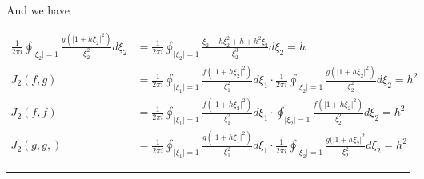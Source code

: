 \documentclass[twoside]{article}
\newenvironment{proof}{{\bf Proof:}}{\hfill\rule{2mm}{2mm}}
\begin{document}
\begin{proof}
And we have

\begin{equation}
	\begin{split}
		\frac{1}{2\pi i}\oint_{\lvert\xi_2\rvert=1}\frac{g(\lvert 1+h\xi_2\rvert^2)}{\xi_2^2}d\xi_2&=\frac{1}{2\pi i}\oint_{\lvert\xi_2\rvert=1}\frac{\xi_2+h\xi_2^2+h+h^2\xi_2}{\xi_2^3}d\xi_2=h\\
		J_2(f,g)&=\frac{1}{2\pi i}\oint_{\lvert\xi_1\rvert=1}\frac{f(\lvert 1+h\xi_2\rvert^2)}{\xi_1^2} d\xi_1\cdot \frac{1}{2\pi i}\oint_{\lvert\xi_2\rvert=1}\frac{g(\lvert 1+h\xi_2\rvert^2)}{\xi_2^2}d\xi_2=h^2\\
		J_2(f,f)&=\frac{1}{2\pi i}\oint_{\lvert\xi_1\rvert=1}\frac{f(\lvert 1+h\xi_2\rvert^2)}{\xi_1^2}d\xi_1\cdot \oint_{\lvert\xi_2\rvert=1}\frac{f(\lvert 1+h\xi_2\rvert^2)}{\xi_2^2}d\xi_2=h^2\\
		J_2(g,g,)&=\frac{1}{2\pi i}\oint_{\lvert\xi_1\rvert=1}\frac{g(\lvert 1+h\xi_1\rvert^2)}{\xi_1^2}d\xi_1\cdot\frac{1}{2\pi i}\oint_{\lvert\xi_2\rvert=1}\frac{g(\lvert 1+h\xi_2\rvert ^2}{\xi_2^2}d\xi_2=h^2
	\end{split}
\end{equation}
\end{proof}
\end{document}
